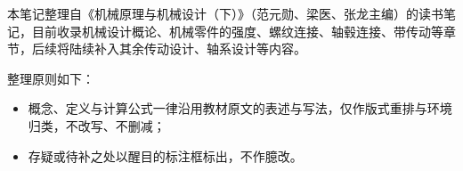 本笔记整理自《机械原理与机械设计（下）》（范元勋、梁医、张龙主编）的读书笔记，目前收录机械设计概论、机械零件的强度、螺纹连接、轴毂连接、带传动等章节，后续将陆续补入其余传动设计、轴系设计等内容。

整理原则如下：

\begin{itemize}
	\item 概念、定义与计算公式一律沿用教材原文的表述与写法，仅作版式重排与环境归类，不改写、不删减；
	\item 存疑或待补之处以醒目的标注框标出，不作臆改。
\end{itemize}

